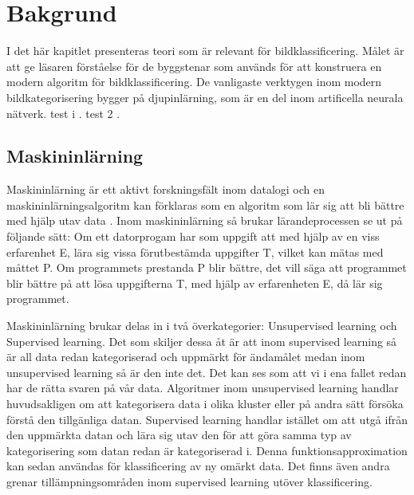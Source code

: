 \documentclass[]{kththesis}
\begin{document}
\chapter{Bakgrund}
I det här kapitlet presenteras teori som är relevant för bildklassificering. Målet är att ge läsaren förståelse för de byggstenar som används för att konstruera en modern algoritm för bildklassificering. De vanligaste verktygen inom modern bildkategorisering bygger på djupinlärning, som är en del inom artificella neurala nätverk.
test i \cite{Goodfellow-et-al-2016}. test 2 \textcite{Goodfellow-et-al-2016}.

\section{Maskininlärning}
Maskininlärning är ett aktivt forskningsfält inom datalogi och en maskininlärningsalgoritm kan förklaras som en algoritm som lär sig att bli bättre med hjälp utav data \parencite{Goodfellow-et-al-2016}. Inom maskininlärning så brukar lärandeprocessen se ut på följande sätt: Om ett datorprogam har som uppgift att med hjälp av en viss erfarenhet E, lära sig vissa förutbestämda uppgifter T, vilket kan mätas med måttet P. Om programmets prestanda P blir bättre, det vill säga att programmet blir bättre på att lösa uppgifterna T, med hjälp av erfarenheten E, då lär sig programmet.

Maskininlärning brukar delas in i två överkategorier: Unsupervised learning och Supervised learning. Det som skiljer dessa åt är att inom supervised learning så är all data redan kategoriserad och uppmärkt för ändamålet medan inom unsupervised learning så är den inte det. Det kan ses som att vi i ena fallet redan har de rätta svaren på vår data. Algoritmer inom unsupervised learning handlar huvudsakligen om att kategorisera data i olika kluster eller på andra sätt försöka förstå den tillgänliga datan. Supervised learning handlar istället om att utgå ifrån den uppmärkta datan och lära sig utav den för att göra samma typ av kategorisering som datan redan är kategoriserad i. Denna funktionsapproximation kan sedan användas för klassificering av ny omärkt data. Det finns även andra grenar tillämpningsområden inom supervised learning utöver klassificering.
\end{document}
